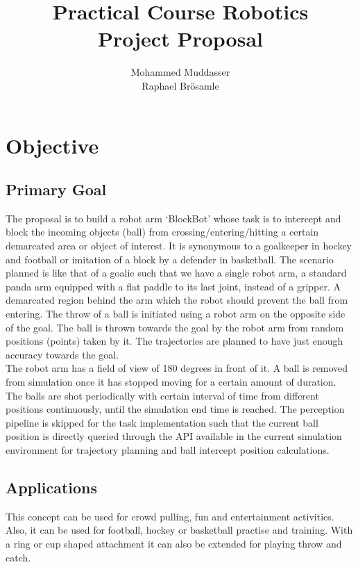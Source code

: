 \documentclass[12pt,pdftex,a4paper]{article}
\begin{document}
\title{Practical Course Robotics\\Project Proposal}
\author{Mohammed Muddasser\\Raphael Brösamle}
\date{}
\maketitle
\section*{Objective}

\subsection*{Primary Goal}
The proposal is to build a robot arm ‘BlockBot’ whose task is to intercept and block the incoming objects (ball) from crossing/entering/hitting a certain demarcated area or object of interest.
It is synonymous to a goalkeeper in hockey and football or imitation of a block by a defender in basketball.
The scenario planned is like that of a goalie such that we have a single robot arm, a standard panda arm equipped with a flat paddle to its last joint, instead of a gripper.
A demarcated region behind the arm which the robot should prevent the ball from entering.
The throw of a ball is initiated using a robot arm on the opposite side of the goal.
The ball is thrown towards the goal by the robot arm from random positions (points) taken by it.
The trajectories are planned to have just enough accuracy towards the goal. \\
$ $ \\
The robot arm has a field of view of 180 degrees in front of it.
A ball is removed from simulation once it has stopped moving for a certain amount of duration.
The balls are shot periodically with certain interval of time from different positions continuously, until the simulation end time is reached.
The perception pipeline is skipped for the task implementation such that the current ball position is directly queried through the API available in the current simulation environment for trajectory planning and ball intercept position calculations.

\subsection*{Applications}
This concept can be used for crowd pulling, fun and entertainment activities.
Also, it can be used for football, hockey or basketball practise and training.
With a ring or cup shaped attachment it can also be extended for playing throw and catch.
\end{document}
